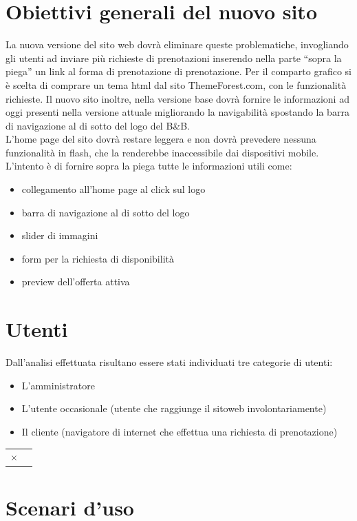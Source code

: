 \documentclass[a4paper,12pt,hidelinks]{report}
\begin{document}
\section{Obiettivi generali del nuovo sito}
La nuova versione del sito web dovrà eliminare queste problematiche, invogliando gli utenti ad inviare più richieste di prenotazioni inserendo nella parte ``sopra la piega'' un link
al forma di prenotazione di prenotazione.
Per il comparto grafico si è scelta di comprare un tema html dal sito ThemeForest.com, con le funzionalità richieste.
Il nuovo sito inoltre, nella versione base dovrà fornire le informazioni ad oggi presenti nella versione attuale migliorando la navigabilità spostando la barra di navigazione al di sotto 
del logo del B\&B.
\\
L'home page del sito dovrà restare leggera e non dovrà prevedere nessuna funzionalità in flash, che la renderebbe inaccessibile dai dispositivi mobile.
L'intento è di fornire sopra la piega tutte le informazioni utili come:
\begin{itemize}
 \item collegamento all'home page al click sul logo
 \item barra di navigazione al di sotto del logo
 \item slider di immagini
 \item form per la richiesta di disponibilità
 \item preview dell'offerta attiva
\end{itemize}

\section{Utenti}
Dall'analisi effettuata risultano essere stati individuati tre categorie di utenti:
\begin{itemize}
 \item L'amministratore
 \item L'utente occasionale (utente che raggiunge il sitoweb involontariamente)
 \item Il cliente (navigatore di internet che effettua una richiesta di prenotazione)
\end{itemize}

\begin{tabular}[!h]{cm}
 ×
\end{tabular}


\section{Scenari d'uso}
\end{document}
